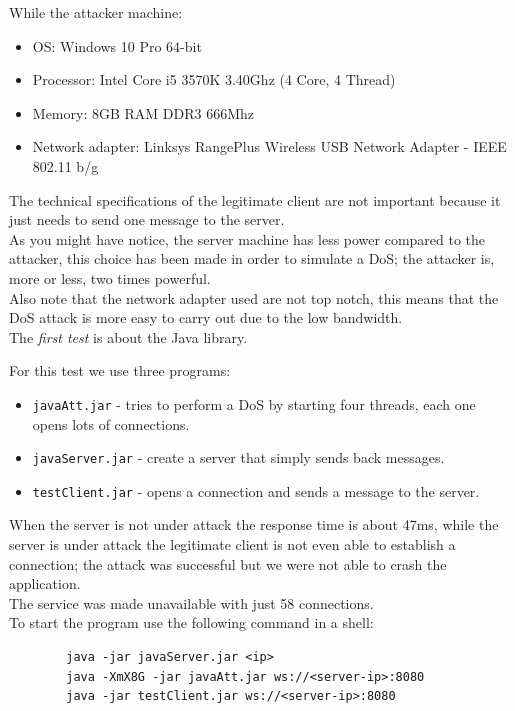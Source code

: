 	While the attacker machine:
	\begin{itemize}
		\item OS: Windows 10 Pro 64-bit
		\item Processor: Intel Core i5 3570K 3.40Ghz (4 Core, 4 Thread)
		\item Memory: 8GB RAM DDR3 666Mhz
		\item Network adapter: Linksys RangePlus Wireless USB Network Adapter - IEEE 802.11 b/g
	\end{itemize}

	The technical specifications of the legitimate client are not important because it just needs to send one message to the server.\\
	As you might have notice, the server machine has less power compared to the attacker, this choice has been made in order to simulate a DoS;
	the attacker is, more or less, two times powerful.\\
	Also note that the network adapter used are not top notch, this means that the DoS attack is more easy to carry out due to the low bandwidth.\\

	The \emph{first test} is about the Java library.

	For this test we use three programs:
	\begin{itemize}
		\item \texttt{javaAtt.jar} - tries to perform a DoS by starting four threads, each one opens lots of connections.
		\item \texttt{javaServer.jar} - create a server that simply sends back messages.
		\item \texttt{testClient.jar} - opens a connection and sends a message to the server. 
	\end{itemize}

	When the server is not under attack the response time is about 47ms, while the server is under attack the legitimate client is not even able to
	establish a connection; the attack was successful but we were not able to crash the application.\\
	The service was made unavailable with just 58 connections.\\

	To start the program use the following command in a shell:
	\begin{lstlisting}
		java -jar javaServer.jar <ip>
		java -XmX8G -jar javaAtt.jar ws://<server-ip>:8080
		java -jar testClient.jar ws://<server-ip>:8080
	\end{lstlisting}

